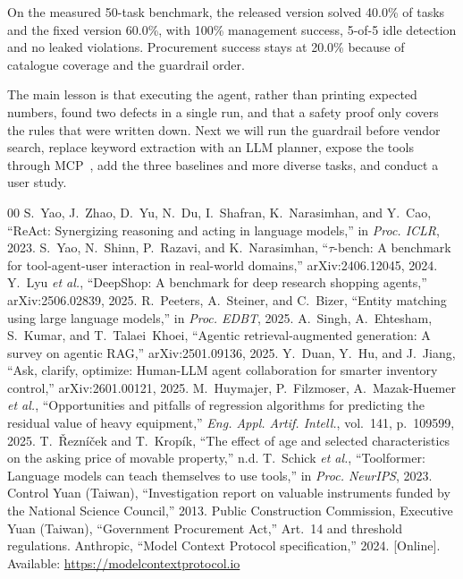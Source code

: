 \documentclass[conference]{IEEEtran}
\begin{document}
On the measured 50-task benchmark, the released version solved 40.0\% of
tasks and the fixed version 60.0\%, with 100\% management success,
5-of-5 idle detection and no leaked violations. Procurement success stays
at 20.0\% because of catalogue coverage and the guardrail order.

The main lesson is that executing the agent, rather than printing
expected numbers, found two defects in a single run, and that a safety
proof only covers the rules that were written down. Next we will run the
guardrail before vendor search, replace keyword extraction with an LLM
planner, expose the tools through MCP~\cite{mcp2024}, add the three
baselines and more diverse tasks, and conduct a user study.

\begin{thebibliography}{00}
 S.~Yao, J.~Zhao, D.~Yu, N.~Du, I.~Shafran, K.~Narasimhan, and Y.~Cao, ``ReAct: Synergizing reasoning and acting in language models,'' in \textit{Proc. ICLR}, 2023.
 S.~Yao, N.~Shinn, P.~Razavi, and K.~Narasimhan, ``$\tau$-bench: A benchmark for tool-agent-user interaction in real-world domains,'' arXiv:2406.12045, 2024.
 Y.~Lyu \textit{et al.}, ``DeepShop: A benchmark for deep research shopping agents,'' arXiv:2506.02839, 2025.
 R.~Peeters, A.~Steiner, and C.~Bizer, ``Entity matching using large language models,'' in \textit{Proc. EDBT}, 2025.
 A.~Singh, A.~Ehtesham, S.~Kumar, and T.~Talaei~Khoei, ``Agentic retrieval-augmented generation: A survey on agentic RAG,'' arXiv:2501.09136, 2025.
 Y.~Duan, Y.~Hu, and J.~Jiang, ``Ask, clarify, optimize: Human-LLM agent collaboration for smarter inventory control,'' arXiv:2601.00121, 2025.
 M.~Huymajer, P.~Filzmoser, A.~Mazak-Huemer \textit{et al.}, ``Opportunities and pitfalls of regression algorithms for predicting the residual value of heavy equipment,'' \textit{Eng. Appl. Artif. Intell.}, vol.~141, p.~109599, 2025.
 T.~\v{R}ezn\'{i}\v{c}ek and T.~Krop\'{i}k, ``The effect of age and selected characteristics on the asking price of movable property,'' n.d.
 T.~Schick \textit{et al.}, ``Toolformer: Language models can teach themselves to use tools,'' in \textit{Proc. NeurIPS}, 2023.
 Control Yuan (Taiwan), ``Investigation report on valuable instruments funded by the National Science Council,'' 2013.
 Public Construction Commission, Executive Yuan (Taiwan), ``Government Procurement Act,'' Art.~14 and threshold regulations.
 Anthropic, ``Model Context Protocol specification,'' 2024. [Online]. Available: \url{https://modelcontextprotocol.io}
\end{thebibliography}
\end{document}
